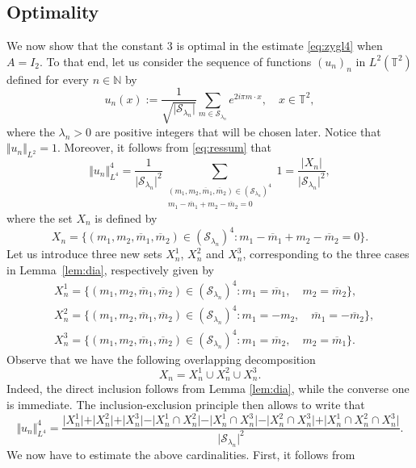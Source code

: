 \documentclass[a4paper,11pt]{amsart}
\numberwithin{equation}{section}
\theoremstyle{definition}
\begin{document}
\subsection{Optimality} We now show that the constant $3$ is optimal in the estimate \eqref{eq:zygl4} when $A = I_2$. To that end, let us consider the sequence of functions $(u_n)_n$ in $L^2(\mathbb T^2)$ defined for every $n\in\mathbb N$ by
\[
    u_n(x) := \frac{1}{\sqrt{\vert\mathcal S_{\lambda_n}\vert}} \sum_{m\in\mathcal S_{\lambda_n}} e^{2i\pi m \cdot x},\quad x\in\mathbb T^2,
\]
where the $\lambda_n>0$ are positive integers that will be chosen later. Notice that $\Vert u_n\Vert_{L^2} = 1$. Moreover, it follows from \eqref{eq:ressum} that
\[
    \Vert u_n\Vert^4_{L^4} = \frac1{\vert\mathcal S_{\lambda_n}\vert^2}\sum_{\substack{(m_1,m_2,\overline{m}_1,\overline{m}_2)\in(\mathcal S_{\lambda_n})^4 \\[2pt] m_1 - \overline m_1 + m_2 - \overline m_2 = 0}}1
    = \frac{\vert X_n\vert}{\vert\mathcal S_{\lambda_n}\vert^2},
\]
where the set $X_n$ is defined by
\[
    X_n = \big\{(m_1,m_2,\overline{m}_1,\overline{m}_2)\in(\mathcal S_{\lambda_n})^4 : m_1 - \overline m_1 + m_2 - \overline m_2 = 0\big\}.
\]
Let us introduce three new sets $X^1_n$, $X^2_n$ and $X^3_n$, corresponding to the three cases in Lemma~\ref{lem:dia}, respectively given by
\begin{align*}
    & X^1_n = \big\{(m_1,m_2,\overline{m}_1,\overline{m}_2)\in(\mathcal S_{\lambda_n})^4 : m_1 = \overline{m}_1,\quad m_2 = \overline{m}_2\big\}, \\[5pt]
    & X^2_n = \big\{(m_1,m_2,\overline{m}_1,\overline{m}_2)\in(\mathcal S_{\lambda_n})^4 : m_1 = -m_2,\quad \overline{m}_1 = -\overline{m}_2\big\}, \\[5pt]
    & X^3_n = \big\{(m_1,m_2,\overline{m}_1,\overline{m}_2)\in(\mathcal S_{\lambda_n})^4 : m_1 = \overline{m}_2,\quad m_2 = \overline{m}_1\big\}.
\end{align*}
Observe that we have the following overlapping decomposition
\[
    X_n = X^1_n \cup X^2_n \cup X^3_n.
\]
Indeed, the direct inclusion follows from Lemma \ref{lem:dia}, while the converse one is immediate. The inclusion-exclusion principle then allows to write that
\[
    \Vert u_n\Vert^4_{L^4} = \frac{\vert X^1_n\vert + \vert X^2_n\vert + \vert X^3_n\vert - \vert X^1_n\cap X^2_n\vert - \vert X^1_n\cap X^3_n\vert - \vert X^2_n\cap X^3_n\vert + \vert X^1_n\cap X^2_n\cap X^3_n\vert}{\vert\mathcal S_{\lambda_n}\vert^2}.
\]
We now have to estimate the above cardinalities. First, 
it follows from 
\end{document}
